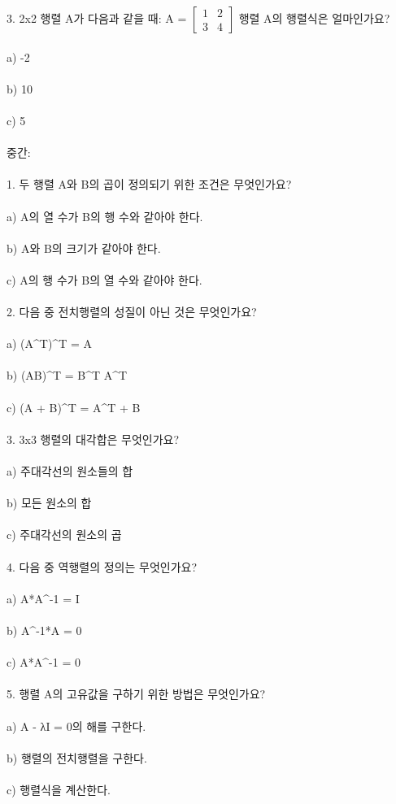 \documentclass[fleqn]{article}
\begin{document}
3. 2x2 행렬 A가 다음과 같을 때: A = \(\begin{bmatrix} 1 & 2 \\ 3 & 4 \end{bmatrix}\) 행렬 A의 행렬식은 얼마인가요? \\\\
   a) -2 \\\\
   b) 10 \\\\
   c) 5 \\\\
  
중간: \\\\  
1. 두 행렬 A와 B의 곱이 정의되기 위한 조건은 무엇인가요? \\\\
   a) A의 열 수가 B의 행 수와 같아야 한다. \\\\
   b) A와 B의 크기가 같아야 한다. \\\\
   c) A의 행 수가 B의 열 수와 같아야 한다. \\\\
  
2. 다음 중 전치행렬의 성질이 아닌 것은 무엇인가요? \\\\
   a) (A^T)^T = A \\\\
   b) (AB)^T = B^T A^T \\\\
   c) (A + B)^T = A^T + B \\\\
  
3. 3x3 행렬의 대각합은 무엇인가요? \\\\
   a) 주대각선의 원소들의 합 \\\\
   b) 모든 원소의 합 \\\\
   c) 주대각선의 원소의 곱 \\\\
  
4. 다음 중 역행렬의 정의는 무엇인가요? \\\\
   a) A*A^{-1} = I \\\\
   b) A^{-1}*A = 0 \\\\
   c) A*A^{-1} = 0 \\\\
  
5. 행렬 A의 고유값을 구하기 위한 방법은 무엇인가요? \\\\
   a) A - λI = 0의 해를 구한다. \\\\
   b) 행렬의 전치행렬을 구한다. \\\\
   c) 행렬식을 계산한다. \\\\

      
      
\end{document}
